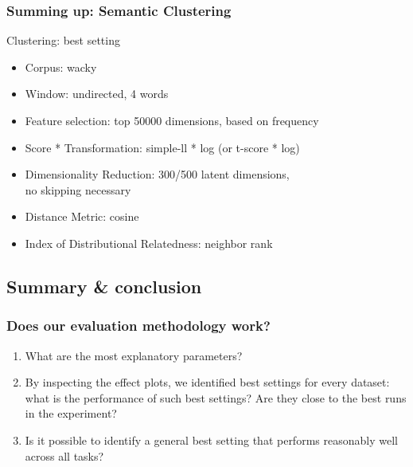\documentclass[t]{beamer} %
\begin{document}
\begin{frame}
  \frametitle{Summing up: Semantic Clustering}
  \begin{exampleblock}{Clustering: best setting}
    \begin{itemize}
    \item Corpus: wacky
    \item Window: undirected, 4 words 
    \item Feature selection: top 50000 dimensions, based on frequency
    \item Score * Transformation: simple-ll * log (or t-score * log)
    \item Dimensionality Reduction: 300/500 latent dimensions,\\ no skipping necessary
    \item Distance Metric: cosine
    \item Index of Distributional Relatedness: neighbor rank
    \end{itemize}
  \end{exampleblock}   
  
\end{frame}


\subsection{Summary \& conclusion}

\begin{frame}
  \frametitle{Does our evaluation methodology work?}

  \begin{enumerate}
  \item What are the most explanatory parameters?
  \item By inspecting the effect plots, we identified best settings for every dataset: what is the performance of such best settings? Are they close to the best runs in the experiment? 
  \item Is it possible to identify a general best setting that performs reasonably well across all tasks?
  \end{enumerate}
  
\end{frame}
\end{document}
